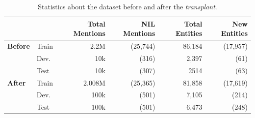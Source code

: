 \begin{table}[htbp]
    \centering
    \caption{Statistics about the dataset before and after the \textit{transplant}.}
    \label{tab:dataset_nils}
    \begin{tabular}{ll|rr|rr}
    \toprule
    && \textbf{Total Mentions} & \textbf{NIL Mentions} & \textbf{Total Entities} & \textbf{New Entities} \\
    \midrule
        \textbf{Before} &Train & 2.2M & (25,744)  & 86,184 & (17,957) \\
        &Dev.   & 10k  & (316)    & 2,397  & (61) \\
        &Test  & 10k  &(307)     & 2514  & (63) \\
        \toprule
       \textbf{After}&Train & 2.008M & (25,365)  & 81,858 & (17,619) \\
       &Dev.   & 100k   & (501)     & 7,105 & (214) \\
       &Test  & 100k   & (501)     & 6,473 & (248) \\
    \end{tabular}
\end{table}
\vspace{-20pt}

